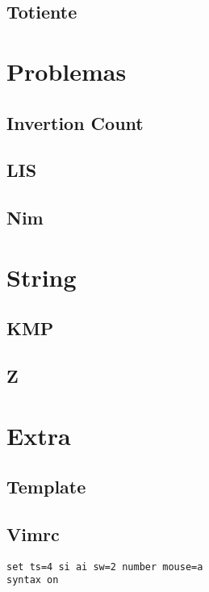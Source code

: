 \documentclass[12pt]{article}
\begin{document}
\subsection{Totiente}




%
%

\section{Problemas}

\subsection{Invertion Count}


\subsection{LIS}


\subsection{Nim}




%
%

\section{String}

\subsection{KMP}


\subsection{Z}




%
%

\section{Extra}

\subsection{Template}


\subsection{Vimrc}
\begin{lstlisting}
set ts=4 si ai sw=2 number mouse=a
syntax on
\end{lstlisting}
\end{document}
